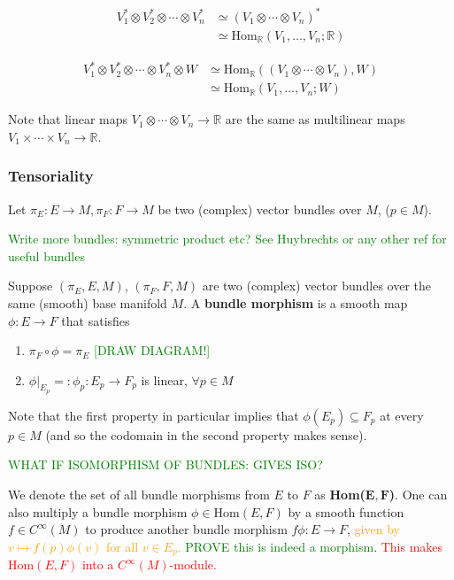\documentclass[a4paper]{article}
\theoremstyle{definition} \newtheorem*{definition}{Definition}
\theoremstyle{definition} \newtheorem*{definitions}{Definitions}
\theoremstyle{plain} \newtheorem{theorem}{Theorem}[section]
\theoremstyle{plain} \newtheorem{proposition}[theorem]{Proposition}
\theoremstyle{plain} \newtheorem{corollary}[theorem]{Corollary}
\theoremstyle{plain} \newtheorem{lemma}[theorem]{Lemma}
\theoremstyle{plain} \newtheorem{example}[theorem]{Example}
\newcommand{\checkCorrect}[1]{\textcolor{red}{#1}}
\newcommand{\understandBetter}[1]{\textcolor{orange}{#1}}
\newcommand{\finish}[1]{\textcolor{green}{#1}}
\newcommand{\defn}[1]{\textbf{#1}}
\newcommand{\realnos}{\mathbb{R}}
\newcommand{\Hom}{\text{Hom}}
\begin{document}
\begin{align*}
V_1^* \otimes V_2^* \otimes \cdots \otimes V_n^* & \simeq (V_1\otimes \cdots \otimes V_n)^* \\
& \simeq \Hom_\realnos (V_1, \ldots, V_n; \realnos) 
\end{align*}

\begin{align*}
V_1^* \otimes V_2^* \otimes \cdots \otimes V_n^* \otimes W & \simeq \Hom_\realnos((V_1\otimes \cdots \otimes V_n), W) \\
& \simeq \Hom_\realnos (V_1, \ldots, V_n; W) 
\end{align*}

Note that linear maps $V_1\otimes \cdots \otimes V_n\to \realnos$ are the same as multilinear maps $V_1\times \cdots \times V_n \to \realnos$.

\subsubsection{Tensoriality}
Let $\pi_E:E\to M, \pi_F:F\to M$ be two (complex) vector bundles over $M$, ($p\in M$).

\finish{Write more bundles: symmetric product etc? See Huybrechts or any other ref for useful bundles}

Suppose $(\pi_E, E, M)$, $(\pi_F, F, M)$ are two (complex) vector bundles over the same (smooth) base manifold $M$. A \defn{bundle morphism} is a smooth map $\phi:E\to F$ that satisfies
\begin{enumerate}
    \item $\pi_F\circ \phi = \pi_E$ \finish{[DRAW DIAGRAM!]}
    \item $\phi \vert_{E_p}=:\phi_p:E_p\to F_p$ is linear, $\forall p\in M$
\end{enumerate}
Note that the first property in particular implies that $\phi(E_p)\subseteq F_p$ at every $p\in M$ (and so the codomain in the second property makes sense).  

\finish{WHAT IF ISOMORPHISM OF BUNDLES: GIVES ISO?}

We denote the set of all bundle morphisms from $E$ to $F$ as \defn{Hom($\mathbf{E, F}$)}. One can also multiply a bundle morphism $\phi \in \text{Hom}(E, F)$ by a smooth function $f\in C^\infty (M)$ to produce another bundle morphism $f \phi :E\to F$,
\understandBetter{given by $v\mapsto f(p)\phi(v)$ for all $v\in E_p$.} \finish{PROVE this is indeed a morphism}. 
\checkCorrect{This makes $\text{Hom}(E, F)$ into a $C^\infty(M)$-module.} 
\end{document}
